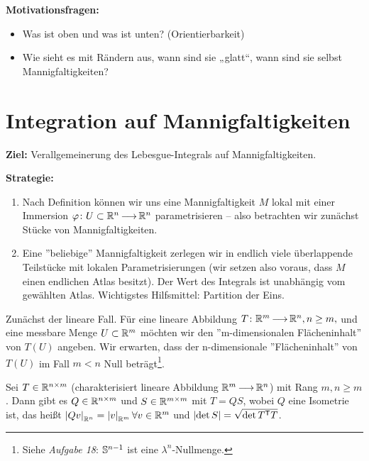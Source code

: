 \documentclass[skript.tex]{subfiles}
\begin{document}
\setcounter{chapter}{4}
\setcounter{section}{1}

\textbf{Motivationsfragen:}
\begin{itemize}
	\item Was ist oben und was ist unten? (Orientierbarkeit)
	\item Wie sieht es mit Rändern aus, wann sind sie „glatt“, wann sind sie selbst Mannigfaltigkeiten?
\end{itemize}

\section{Integration auf Mannigfaltigkeiten}
\textbf{Ziel:} Verallgemeinerung des Lebesgue-Integrals auf Mannigfaltigkeiten.

\textbf{Strategie:}
\begin{enumerate}
	\item Nach Definition können wir uns eine Mannigfaltigkeit $M$ lokal mit einer Immersion $\varphi \colon U\subset{\mathbb{R}^n} \kern -1pt \longrightarrow \kern -1pt {\mathbb{R}^n}$ parametrisieren -- also betrachten wir zunächst Stücke von Mannigfaltigkeiten.
	
	\item Eine ''beliebige'' Mannigfaltigkeit zerlegen wir in endlich viele überlappende Teilstücke mit lokalen Parametrisierungen (wir setzen also voraus, dass $M$ einen endlichen Atlas besitzt). Der Wert des Integrals ist unabhängig vom gewählten Atlas. Wichtigstes Hilfsmittel: Partition der Eins.
\end{enumerate}

Zunächst der lineare Fall. Für eine lineare Abbildung $T \colon \mathbb{R}^m \kern -1pt \longrightarrow \kern -1pt {\mathbb{R}^n}, n\geq m,$ und eine messbare Menge $U\subset \mathbb{R}^m$ möchten wir den ''m-dimensionalen Flächeninhalt'' von $T(U)$ angeben. Wir erwarten, dass der n-dimensionale ''Flächeninhalt'' von $T(U)$ im Fall $m<n$ Null beträgt\footnote{Siehe \textit{Aufgabe 18}: $\mathbb{S}^{n-1}$ ist eine $\lambda^n$-Nullmenge.}.

\begin{lem}
	Sei $T\in\mathbb{R}^{n\times m}$ (charakterisiert lineare Abbildung $\mathbb{R}^m \kern -1pt \longrightarrow \kern -1pt {\mathbb{R}^n}$) mit Rang $m, n\geq m$. Dann gibt es $Q \in \mathbb{R}^{n\times m}$  und $S \in \mathbb{R}^{m\times m}$ mit $T=QS$, wobei $Q$ eine \textup{Isometrie} ist, das heißt $\left| Qv \right|_{\mathbb{R}^n} = \left| v \right|_{\mathbb{R}^m} \forall v \in \mathbb{R}^m$ und $\left| \det S \right| = \sqrt{\det T^{\mathsf{T}} T }$.
\end{lem}
\end{document}
